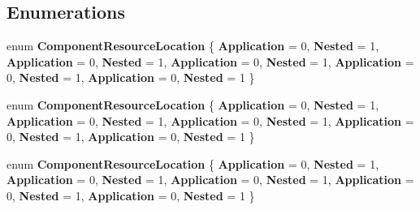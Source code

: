 \subsection*{Enumerations}
\begin{DoxyCompactItemize}
\item 
\mbox{\label{namespace_windows_1_1_u_i_1_1_xaml_1_1_controls_1_1_primitives_ab75c957e426602c7b96043a866a2231c}} 
enum {\bfseries Component\+Resource\+Location} \{ \newline
{\bfseries Application} = 0, 
{\bfseries Nested} = 1, 
{\bfseries Application} = 0, 
{\bfseries Nested} = 1, 
\newline
{\bfseries Application} = 0, 
{\bfseries Nested} = 1, 
{\bfseries Application} = 0, 
{\bfseries Nested} = 1, 
\newline
{\bfseries Application} = 0, 
{\bfseries Nested} = 1
 \}
\item 
\mbox{\label{namespace_windows_1_1_u_i_1_1_xaml_1_1_controls_1_1_primitives_ab75c957e426602c7b96043a866a2231c}} 
enum {\bfseries Component\+Resource\+Location} \{ \newline
{\bfseries Application} = 0, 
{\bfseries Nested} = 1, 
{\bfseries Application} = 0, 
{\bfseries Nested} = 1, 
\newline
{\bfseries Application} = 0, 
{\bfseries Nested} = 1, 
{\bfseries Application} = 0, 
{\bfseries Nested} = 1, 
\newline
{\bfseries Application} = 0, 
{\bfseries Nested} = 1
 \}
\item 
\mbox{\label{namespace_windows_1_1_u_i_1_1_xaml_1_1_controls_1_1_primitives_ab75c957e426602c7b96043a866a2231c}} 
enum {\bfseries Component\+Resource\+Location} \{ \newline
{\bfseries Application} = 0, 
{\bfseries Nested} = 1, 
{\bfseries Application} = 0, 
{\bfseries Nested} = 1, 
\newline
{\bfseries Application} = 0, 
{\bfseries Nested} = 1, 
{\bfseries Application} = 0, 
{\bfseries Nested} = 1, 
\newline
{\bfseries Application} = 0, 
{\bfseries Nested} = 1
 \}
\item 
\mbox{\label{namespace_windows_1_1_u_i_1_1_xaml_1_1_controls_1_1_primitives_ab75c957e426602c7b96043a866a2231c}} 

\end{DoxyCompactItemize}
